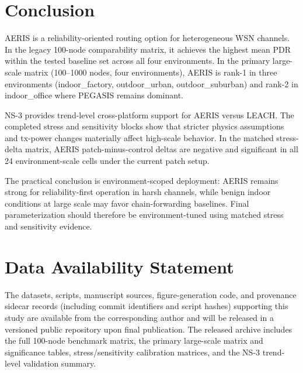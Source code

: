 ﻿\documentclass[sensors,article,submit,moreauthors,pdftex]{Definitions/mdpi}
\begin{document}
\section{Conclusion}
AERIS is a reliability-oriented routing option for heterogeneous WSN channels. In the legacy 100-node comparability matrix, it achieves the highest mean PDR within the tested baseline set across all four environments. In the primary large-scale matrix (100--1000 nodes, four environments), AERIS is rank-1 in three environments (indoor\_factory, outdoor\_urban, outdoor\_suburban) and rank-2 in indoor\_office where PEGASIS remains dominant.

NS-3 provides trend-level cross-platform support for AERIS versus LEACH. The completed stress and sensitivity blocks show that stricter physics assumptions and tx-power changes materially affect high-scale behavior. In the matched stress-delta matrix, AERIS patch-minus-control deltas are negative and significant in all 24 environment-scale cells under the current patch setup.

The practical conclusion is environment-scoped deployment: AERIS remains strong for reliability-first operation in harsh channels, while benign indoor conditions at large scale may favor chain-forwarding baselines. Final parameterization should therefore be environment-tuned using matched stress and sensitivity evidence.

\section*{Data Availability Statement}
The datasets, scripts, manuscript sources, figure-generation code, and provenance sidecar records (including commit identifiers and script hashes) supporting this study are available from the corresponding author and will be released in a versioned public repository upon final publication. The released archive includes the full 100-node benchmark matrix, the primary large-scale matrix and significance tables, stress/sensitivity calibration matrices, and the NS-3 trend-level validation summary.
\end{document}
